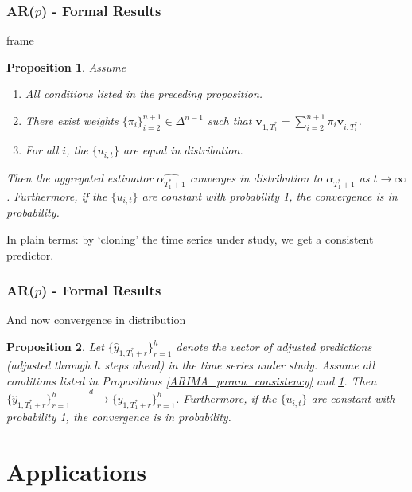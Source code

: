 \documentclass[9pt]{beamer}
\newcommand{\weight}{\pi}
\newtheorem{prop}{Proposition}
\theoremstyle{definition}
\begin{document}
\begin{frame}\frametitle{AR($p$) - Formal Results} 

    frame
\begin{prop}\label{ARIMA_aggregated_alpha}
Assume
  \begin{enumerate}
    \item All conditions listed in the preceding proposition.
    \item There exist weights $\{\pi_{i}\}_{i=2}^{n+1} \in \Delta^{n-1}$  such that $\textbf{v}_{1,T_{1}^{*}} = \sum^{n+1}_{i=2}\weight_{i} \textbf{v}_{i,T_{i}^{*}}$.
    \item For all $i$, the $\{u_{i,t}\}$ are equal in distribution.
   \end{enumerate}

   Then the aggregated estimator $\hat{\alpha_{T^{*}_{1}+1}}$ converges in distribution to $\alpha_{T^{*}_{1}+1}$ as $t \rightarrow \infty$.  Furthermore, if the $\{u_{i,t}\}$ are constant with probability 1, the convergence is in probability.
  \end{prop}

  In plain terms: by `cloning' the time series under study, we get a consistent predictor.

\end{frame}


\begin{frame}\frametitle{AR($p$) - Formal Results} 

    And now convergence in distribution

\begin{prop}\label{ARIMA_conv_distribution}
  Let $\{\hat y_{1,T_{1}^{*}+r}\}^{h}_{r=1}$ denote the vector of adjusted predictions (adjusted through $h$ steps ahead) in the time series under study.  Assume all conditions listed in Propositions \ref{ARIMA_param_consistency} and \ref{ARIMA_aggregated_alpha}.  Then $\{\hat y_{1,T_{1}^{*}+r}\}^{h}_{r=1} \xrightarrow{\qquad d\qquad} \{ y_{1,T_{1}^{*}+r}\}^{h}_{r=1}$.  Furthermore, if the $\{u_{i,t}\}$ are constant with probability 1, the convergence is in probability. 
  \end{prop}

\end{frame}

\section{Applications}
\end{document}
